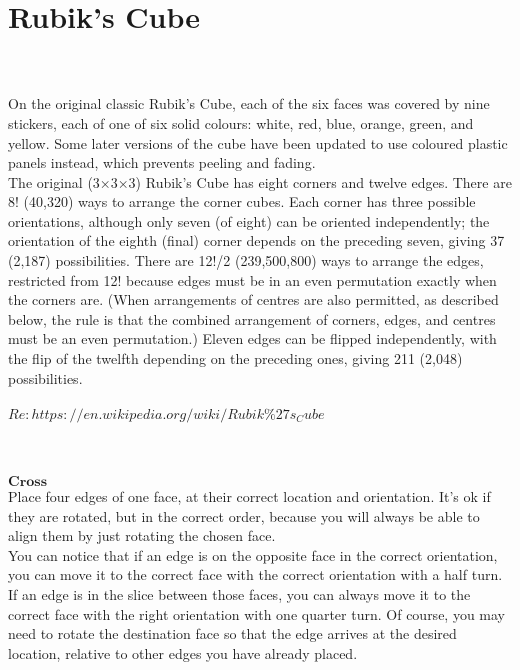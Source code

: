 \documentclass{article}
\begin{document}
\section{Rubik’s Cube}
\\\\On the original classic Rubik's Cube, each of the six faces was covered by nine stickers, each of one of six solid colours: white, red, blue, orange, green, and yellow. Some later versions of the cube have been updated to use coloured plastic panels instead, which prevents peeling and fading.
\\The original (3×3×3) Rubik's Cube has eight corners and twelve edges. There are 8! (40,320) ways to arrange the corner cubes. Each corner has three possible orientations, although only seven (of eight) can be oriented independently; the orientation of the eighth (final) corner depends on the preceding seven, giving 37 (2,187) possibilities. There are 12!/2 (239,500,800) ways to arrange the edges, restricted from 12! because edges must be in an even permutation exactly when the corners are. (When arrangements of centres are also permitted, as described below, the rule is that the combined arrangement of corners, edges, and centres must be an even permutation.) Eleven edges can be flipped independently, with the flip of the twelfth depending on the preceding ones, giving 211 (2,048) possibilities.
\\\\$Re:https://en.wikipedia.org/wiki/Rubik\%27s_Cube $
\\\\
\\$\textbf{Cross}$
\\Place four edges of one face, at their correct location and orientation. It's ok if they are rotated, but in the correct order, because you will always be able to align them by just rotating the chosen face.
\\You can notice that if an edge is on the opposite face in the correct orientation, you can move it to the correct face with the correct orientation with a half turn. If an edge is in the slice between those faces, you can always move it to the correct face with the right orientation with one quarter turn. Of course, you may need to rotate the destination face so that the edge arrives at the desired location, relative to other edges you have already placed.
\end{document}
